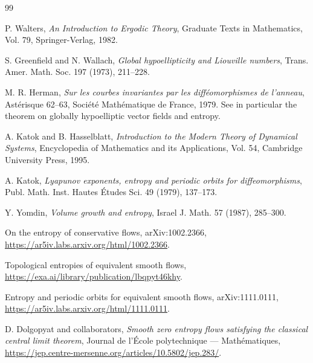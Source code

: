 \documentclass[11pt]{article}
\theoremstyle{definition}
\theoremstyle{remark}
\numberwithin{equation}{section}
\begin{document}
\begin{thebibliography}{99}

P. Walters,
\emph{An Introduction to Ergodic Theory},
Graduate Texts in Mathematics, Vol. 79, Springer-Verlag, 1982.

S. Greenfield and N. Wallach,
\emph{Global hypoellipticity and Liouville numbers},
Trans. Amer. Math. Soc. 197 (1973), 211--228.

M. R. Herman,
\emph{Sur les courbes invariantes par les diff\'eomorphismes de l'anneau},
Ast\'erisque 62--63, Soci\'et\'e Math\'ematique de France, 1979.
See in particular the theorem on globally hypoelliptic vector fields and
entropy.

A. Katok and B. Hasselblatt,
\emph{Introduction to the Modern Theory of Dynamical Systems},
Encyclopedia of Mathematics and its Applications, Vol. 54,
Cambridge University Press, 1995.

A. Katok,
\emph{Lyapunov exponents, entropy and periodic orbits for diffeomorphisms},
Publ. Math. Inst. Hautes \'Etudes Sci. 49 (1979), 137--173.

Y. Yomdin,
\emph{Volume growth and entropy},
Israel J. Math. 57 (1987), 285--300.

On the entropy of conservative flows,
arXiv:1002.2366,
\url{https://ar5iv.labs.arxiv.org/html/1002.2366}.

Topological entropies of equivalent smooth flows,
\url{https://exa.ai/library/publication/lbqpyt46khy}.

Entropy and periodic orbits for equivalent smooth flows,
arXiv:1111.0111,
\url{https://ar5iv.labs.arxiv.org/html/1111.0111}.

D. Dolgopyat and collaborators,
\emph{Smooth zero entropy flows satisfying the classical central limit theorem},
Journal de l'\'Ecole polytechnique --- Math\'ematiques,
\url{https://jep.centre-mersenne.org/articles/10.5802/jep.283/}.

\end{thebibliography}
\end{document}
